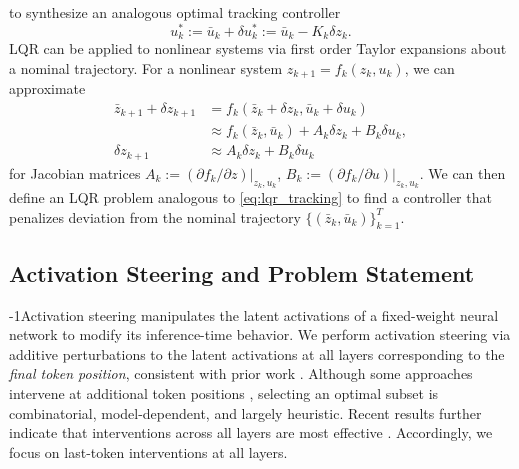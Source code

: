 \documentclass{article}
\theoremstyle{plain}
\theoremstyle{definition}
\theoremstyle{remark}
\begin{document}
to synthesize an analogous optimal tracking controller 
\begin{equation}\label{eq:lqr_u}
    u^*_k := \bar u_k +\delta u^*_k := \bar u_k -K_k\delta z_k.
\end{equation}
LQR can be applied to nonlinear systems via first order Taylor expansions about a nominal trajectory. For a nonlinear system $z_{k+1} = f_k(z_k, u_k)$, 
we can approximate 
\begin{equation}\label{lqr_linearization}
\begin{aligned}
    \bar z_{k+1} + \delta z_{k+1} &= f_k(\bar z_k + \delta z_k, \bar u_k + \delta u_k)\\ 
    &\approx f_k(\bar z_k,\bar u_k) + A_k\delta z_k + B_k\delta u_k, \\
    \delta z_{k+1} &\approx A_k\delta z_k + B_k\delta u_k
\end{aligned}
\end{equation}
for Jacobian matrices $A_k:=(\partial f_k/\partial z)|_{z_k,u_k}$, $B_k := (\partial f_k/\partial u)|_{z_k,u_k}$. We can then define an LQR problem analogous to \eqref{eq:lqr_tracking} to find a controller that penalizes deviation from the nominal trajectory $\{(\bar z_k, \bar u_k)\}_{k=1}^T$.

\vspace{-4pt}
\subsection{Activation Steering and Problem Statement}\label{AS}
\looseness-1Activation steering manipulates the latent activations of a fixed-weight neural network to modify its inference-time behavior. We perform activation steering via additive perturbations to the latent activations at all layers corresponding to the \emph{final token position}, consistent with prior work \cite{Karnik_Bansal_2025, Hedstrom_Amoukou_Bewley}. Although some approaches intervene at additional token positions \cite{Orgad_Toker_Gekhman_Reichart_Szpektor_Kotek_Belinkov_2025}, selecting an optimal subset is combinatorial, model-dependent, and largely heuristic. Recent results further indicate that interventions across all layers are most effective \cite{Hedstrom_Amoukou_Bewley, Nguyen_Vu_Pham_Zhang_Nguyen_2025}. Accordingly, we focus on last-token interventions at all layers.

\vspace{-8pt}
\end{document}
